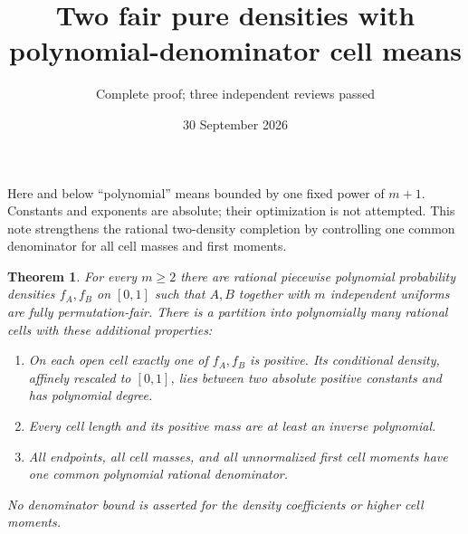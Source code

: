 \documentclass[11pt]{article}
\title{Two fair pure densities with polynomial-denominator cell means}
\author{Complete proof; three independent reviews passed}\date{30 September 2026}
\newtheorem{theorem}{Theorem}\newtheorem{lemma}{Lemma}
\begin{document}
\maketitle
Here and below ``polynomial'' means bounded by one fixed power of $m+1$.
Constants and exponents are absolute; their optimization is not attempted.
This note strengthens the rational two-density completion by controlling
one common denominator for all cell masses and first moments.

\begin{theorem}\label{main}
For every $m\ge2$ there are rational piecewise polynomial probability
densities $f_A,f_B$ on $[0,1]$ such that $A,B$ together with $m$
independent uniforms are fully permutation-fair. There is a partition
into polynomially many rational cells with these additional properties:
\begin{enumerate}
\item On each open cell exactly one of $f_A,f_B$ is positive. Its
conditional density, affinely rescaled to $[0,1]$, lies between two
absolute positive constants and has polynomial degree.
\item Every cell length and its positive mass are at least an inverse
polynomial.
\item All endpoints, all cell masses, and all unnormalized first cell
moments have one common polynomial rational denominator.
\end{enumerate}
No denominator bound is asserted for the density coefficients or higher
cell moments.
\end{theorem}
\end{document}
